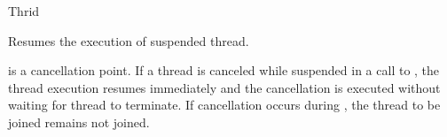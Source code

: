 \begin{classpage}{Thrid}
\begin{mandescription}
  Resumes the execution of  suspended thread.
\end{mandescription}

 is a cancellation point. 
If a thread is canceled while suspended in a call to , the thread execution resumes immediately and the cancellation is executed without waiting for  thread to terminate. 
If cancellation occurs during , the thread to be joined remains not joined.

\end{classpage}
